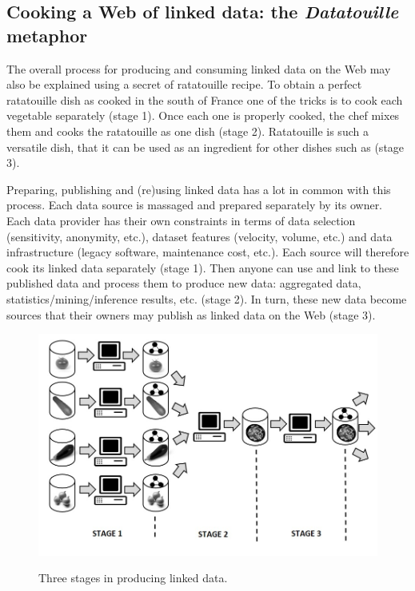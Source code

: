 \hypertarget{cooking-a-web-of-linked-data-the-datatouille-metaphor}{%
\subsection{\texorpdfstring{Cooking a Web of linked data: the
\emph{Datatouille}
metaphor}{Cooking a Web of linked data: the Datatouille metaphor}}\label{cooking-a-web-of-linked-data-the-datatouille-metaphor}}

The overall process for producing and consuming linked data on the Web
may also be explained using a secret of ratatouille recipe. To obtain a
perfect ratatouille dish as cooked in the south of France one of the
tricks is to cook each vegetable separately (stage 1). Once each one is
properly cooked, the chef mixes them and cooks the ratatouille as one
dish (stage 2). Ratatouille is such a versatile dish, that it can be
used as an ingredient for other dishes such as (stage 3).

Preparing, publishing and (re)using linked data has a lot in common with
this process. Each data source is massaged and prepared separately by
its owner. Each data provider has their own
constraints in terms of data selection (sensitivity, anonymity, etc.),
dataset features (velocity, volume, etc.) and data infrastructure
(legacy software, maintenance cost, etc.). Each source will therefore
cook its linked data separately (stage 1). Then anyone can use and link
to these published data and process them to produce new data: aggregated
data, statistics/mining/inference results, etc. (stage 2). In turn,
these new data become sources that their owners may publish as linked
data on the Web (stage 3).

\begin{figure}

\includegraphics[width=5in]{media/ch5/figure-05-13x}
\label{fig:ch5.13x}
\caption{Three stages in producing linked data.}
\end{figure}

